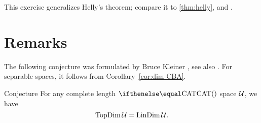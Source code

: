 This exercise generalizes Helly's theorem; compare it to \ref{thm:helly}, \cite[Prop. 5.3]{kleiner} and \cite{ivanov2014}.

\section{Remarks}

The following conjecture was formulated by Bruce Kleiner \cite{kleiner}, see also \cite[p.~133]{gromov:asymt-inv}.
For separable spaces, it follows from Corollary~\ref{cor:dim-CBA}.

\begin{thm}{Conjecture}
For any complete length $\CAT{}$ space $\mathcal{U}$, we have
\[\mathop{\rm TopDim}\nolimits\mathcal{U}
=
\mathop{\rm LinDim}\nolimits\mathcal{U}.\]

\end{thm}



















